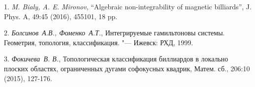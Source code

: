 \litlist

1. {\it M. Bialy, A. E. Mironov}, “Algebraic non-integrability of magnetic billiards”,
J. Phys. A, 49:45 (2016), 455101, 18 pp.

2. {\it Болсинов~А.В., Фоменко~А.Т.}, Интегрируемые гамильтоновы системы. Геометрия, топология, классификация.
"--- Ижевск: РХД, 1999.

3. {\it Фокичева~В. В.}, Топологическая классификация биллиардов в локально плоских областях, ограниченных дугами софокусных квадрик, Матем. сб., 206:10 (2015), 127-176.

